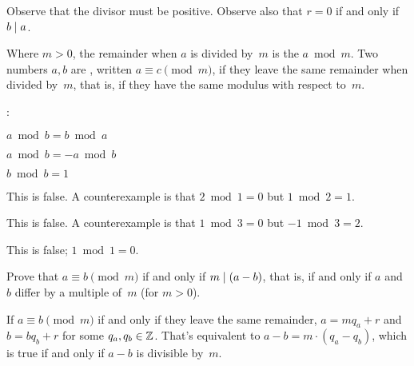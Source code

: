 \documentclass{ibl}  %
\begin{document}
\begin{problem}
\end{problem}

\noindent 
Observe that the divisor must be positive.
Observe also that $r=0$ if and only if $b\mid a$. 

\begin{df}
Where $m>0$, the remainder when $a$ is divided by~$m$ is
the  $a\bmod m$.
Two numbers $a,b$ are , 
written $a\equiv c\pmod m$, 
if they leave the same remainder when divided by~$m$, that is,
if they have the same modulus with respect to~$m$.
\end{df}

\begin{problem}[\midlength]  \pord:
\begin{items}
\item $a\bmod b=b\bmod a$
\item $a\bmod b=-a\bmod b$
\item $b\bmod b=1$
\end{items}
\begin{ans}
\begin{exes}
\item This is false.
  A counterexample is that $2\bmod 1=0$ but $1\bmod 2=1$.
\item This is false.
  A counterexample is that $1\bmod 3=0$ but $-1\bmod 3=2$.
\item This is false;
  $1\bmod 1=0$.     
\end{exes}
\end{ans}
\end{problem}

\begin{problem} \label{ex:AEquivBpmodMIFFABDifferBYMultipleOfM}
Prove that $a\equiv b\pmod m$ if and only if $m\mid (a-b)$,
that is, if and only if $a$ and~$b$ differ by a multiple of~$m$
(for $m>0$).  
\begin{answer}
If $a\equiv b\pmod m$ if and only if they leave the same remainder,
$a=mq_a+r$ and~$b=bq_b+r$ for some $q_a,q_b\in\mathbb{Z}$.
That's equivalent to $a-b=m\cdot(q_a-q_b)$, 
which is true if and only if $a-b$ is divisible by~$m$.
\end{answer}
\end{problem}
\end{document}
